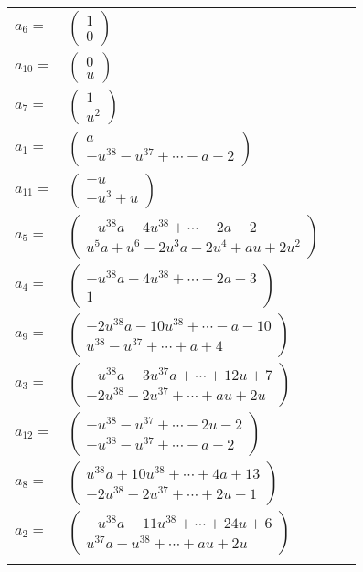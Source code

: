 \documentclass[1p]{elsarticle_modified}
\theoremstyle{definition}
\begin{document}
\begin{tabular}{m{7pt} m{180pt} m{7pt} m{180pt} }
\flushright $a_{6}=$&$\begin{pmatrix}1\\0\end{pmatrix}$ \\
\flushright $a_{10}=$&$\begin{pmatrix}0\\u\end{pmatrix}$ \\
\flushright $a_{7}=$&$\begin{pmatrix}1\\u^2\end{pmatrix}$ \\
\flushright $a_{1}=$&$\begin{pmatrix}a\\- u^{38}- u^{37}+\cdots- a-2\end{pmatrix}$ \\
\flushright $a_{11}=$&$\begin{pmatrix}- u\\- u^3+u\end{pmatrix}$ \\
\flushright $a_{5}=$&$\begin{pmatrix}- u^{38} a-4 u^{38}+\cdots-2 a-2\\u^5 a+u^6-2 u^3 a-2 u^4+a u+2 u^2\end{pmatrix}$ \\
\flushright $a_{4}=$&$\begin{pmatrix}- u^{38} a-4 u^{38}+\cdots-2 a-3\\1\end{pmatrix}$ \\
\flushright $a_{9}=$&$\begin{pmatrix}-2 u^{38} a-10 u^{38}+\cdots- a-10\\u^{38}- u^{37}+\cdots+a+4\end{pmatrix}$ \\
\flushright $a_{3}=$&$\begin{pmatrix}- u^{38} a-3 u^{37} a+\cdots+12 u+7\\-2 u^{38}-2 u^{37}+\cdots+a u+2 u\end{pmatrix}$ \\
\flushright $a_{12}=$&$\begin{pmatrix}- u^{38}- u^{37}+\cdots-2 u-2\\- u^{38}- u^{37}+\cdots- a-2\end{pmatrix}$ \\
\flushright $a_{8}=$&$\begin{pmatrix}u^{38} a+10 u^{38}+\cdots+4 a+13\\-2 u^{38}-2 u^{37}+\cdots+2 u-1\end{pmatrix}$ \\
\flushright $a_{2}=$&$\begin{pmatrix}- u^{38} a-11 u^{38}+\cdots+24 u+6\\u^{37} a- u^{38}+\cdots+a u+2 u\end{pmatrix}$\\&\end{tabular}
\end{document}
